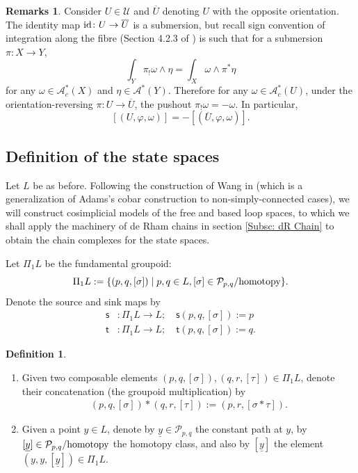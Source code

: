 \documentclass[10pt]{amsart}
\numberwithin{equation}{section}
\theoremstyle{plain}
\theoremstyle{definition}
\newtheorem{definition}[theorem]{Definition}
\newtheorem{remarks}[theorem]{Remarks}
\theoremstyle{remark}
\numberwithin{equation}{section}
\newcommand{\id}{\textup{id}}
\newcommand{\ol}[1]{\overline{#1}}
\newcommand{\mc}[1]{\mathcal{#1}}
\begin{document}
{\begin{remarks}\label{Rmk: SignOri}
	Consider $U\in \mathscr{U}$ and $\ol{U}$ denoting $U$ with the opposite orientation. The identity map $\id\colon U\to \ol{U}$ is a submersion, but recall sign convention of integration along the fibre (Section 4.2.3 of \cite{Irie2}) is such that for a submersion $\pi\colon X\to Y$, \[\int_Y \pi_!\omega\wedge \eta = \int_X \omega\wedge \pi^* \eta\]for any $\omega\in\mathscr{A}_c^*(X)$ and $\eta\in \mathscr{A}^*(Y)$. Therefore for any $\omega\in \mathscr{A}_c^*(U)$, under the orientation-reversing $\pi\colon U\to \ol{U}$, the pushout $\pi_!\omega =-\omega$. In particular, \[[(U,\varphi, \omega) ]=-[(\ol{U},\varphi,\omega)].\]
\end{remarks}

\subsection{Definition of the state spaces}\label{Subsc: StateSpace}

Let $L$ be as before.
Following the construction of Wang in \cite{WangThesis} (which is a generalization of Adams's cobar construction \cite{AdamsCobar} to non-simply-connected cases), we will construct cosimplicial models of the free and based loop spaces, to which we shall apply the machinery of de Rham chains in section \ref{Subsc: dR Chain} to obtain the chain complexes for the state spaces.



Let $\Pi_1 L$ be the fundamental groupoid:
\[
	\Pi_1 L := \{(p,q,[\sigma])\mid p,q\in L, [\sigma]\in \mathcal{P}_{p,q}/\textup{homotopy}\}.
\]
Denote the source and sink maps by
\begin{align*}
	\textsf{s}&\colon \Pi_1 L\to L;\quad \textsf{s}(p,q,[\sigma]):= p\\
	\textsf{t}&\colon \Pi_1 L\to L;\quad \textsf{t}(p,q,[\sigma]):= q.
\end{align*}

\begin{definition}\label{Defn: PathFundGroupoid}
	\begin{enumerate}
		\item Given two composable elements $(p,q,[\sigma]), (q,r,[\tau])\in \Pi_1 L$, denote their concatenation (the groupoid multiplication) by \begin{align}\label{Eq: Concat} (p,q,[\sigma])*(q,r,[\tau]):= (p,r,[\sigma * \tau]).\end{align}
		\item Given a point $y\in L$, denote by $\underline{y}\in \mc{P}_{p,q}$ the constant path at $y$, by $[\underline{y}]\in \mc{P}_{p,q}/\textup{homotopy}$ the homotopy class, and also by $[\underline{y}]$ the element $(y,y,[\underline{y}])\in \Pi_1 L$.
	\end{enumerate}
\end{definition}

}
\end{document}
